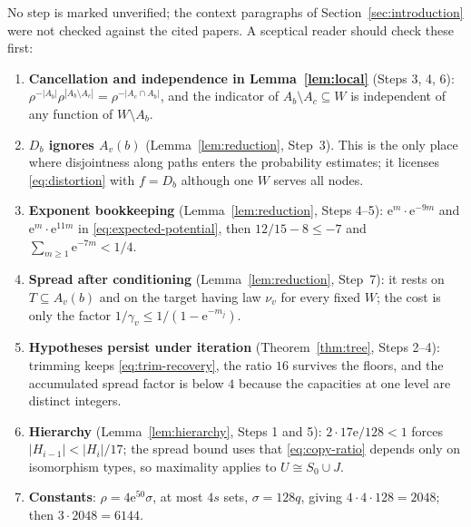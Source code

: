 \documentclass[11pt]{article}
\numberwithin{equation}{section}
\newcommand{\ee}{\mathrm e}
\begin{document}
No step is marked unverified; the context paragraphs of
Section~\ref{sec:introduction} were not checked against the cited
papers. A sceptical reader should check these first:
\begin{enumerate}[itemsep=2pt,topsep=3pt]
 \item \textbf{Cancellation and independence in Lemma~\ref{lem:local}}
 (Steps 3, 4, 6): $\rho^{-|A_b|}\rho^{|A_b\setminus A_c|}
 =\rho^{-|A_c\cap A_b|}$, and the indicator of
 $A_b\setminus A_c\subseteq W$ is independent of any function of
 $W\setminus A_b$.
 \item \textbf{$D_b$ ignores $A_v(b)$} (Lemma~\ref{lem:reduction},
 Step~3). This is the only place where disjointness along paths enters
 the probability estimates; it licenses \eqref{eq:distortion} with
 $f=D_b$ although one $W$ serves all nodes.
 \item \textbf{Exponent bookkeeping} (Lemma~\ref{lem:reduction}, Steps
 4--5): $\ee^{m}\cdot\ee^{-9m}$ and $\ee^{m}\cdot\ee^{11m}$ in
 \eqref{eq:expected-potential}, then $12/15-8\le-7$ and
 $\sum_{m\ge1}\ee^{-7m}<1/4$.
 \item \textbf{Spread after conditioning} (Lemma~\ref{lem:reduction},
 Step~7): it rests on $T\subseteq A_v(b)$ and on the target having law
 $\nu_v$ for every fixed $W$; the cost is only the factor
 $1/\gamma_v\le1/(1-\ee^{-m_j})$.
 \item \textbf{Hypotheses persist under iteration}
 (Theorem~\ref{thm:tree}, Steps 2--4): trimming keeps
 \eqref{eq:trim-recovery}, the ratio $16$ survives the floors, and the
 accumulated spread factor is below $4$ because the capacities at one
 level are distinct integers.
 \item \textbf{Hierarchy} (Lemma~\ref{lem:hierarchy}, Steps 1 and 5):
 $2\cdot17\ee/128<1$ forces $|H_{i-1}|<|H_i|/17$; the spread bound uses
 that \eqref{eq:copy-ratio} depends only on isomorphism types, so
 maximality applies to $U\cong S_0\cup J$.
 \item \textbf{Constants}: $\rho=4\ee^{50}\sigma$, at most $4s$ sets,
 $\sigma=128q$, giving $4\cdot4\cdot128=2048$; then $3\cdot2048=6144$.
\end{enumerate}
\end{document}
